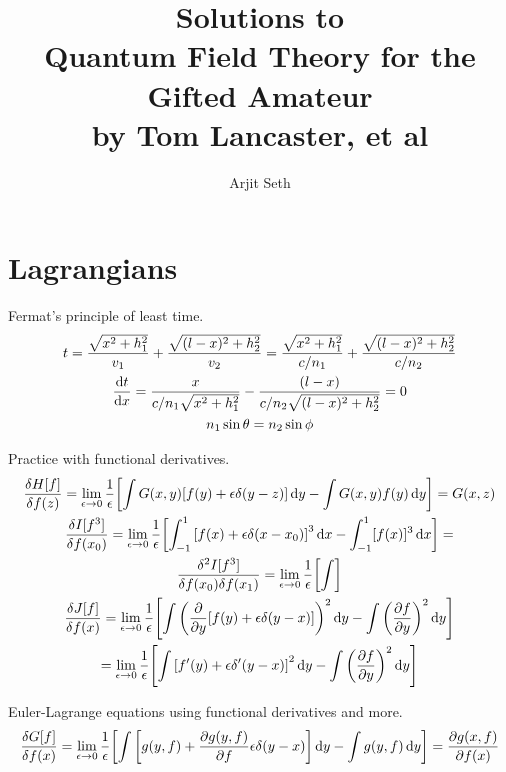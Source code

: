 \documentclass{report}
\begin{document}
\title{Solutions to \\ Quantum Field Theory for the Gifted Amateur \\ by Tom Lancaster, et al}

\author{Arjit Seth}

\maketitle


\chapter{Lagrangians}

\begin{subquests}
	\item Fermat's principle of least time.
	\begin{gather*}
		t = \frac{\sqrt{x^2 + h_1^2}}{v_1} + \frac{\sqrt{(l-x)^2+h_2^2}}{v_2} = \frac{\sqrt{x^2 + h_1^2}}{c/n_1} + \frac{\sqrt{(l-x)^2+h_2^2}}{c/n_2} \\
		\dv{t}{x} = \frac{x}{c/n_1\sqrt{x^2 + h_1^2}} - \frac{(l-x)}{c/n_2\sqrt{(l-x)^2 + h_2^2}} = 0 \\
		n_1\sin\theta = n_2\sin\phi
	\end{gather*}
	
	\item Practice with functional derivatives.
	\begin{gather*}
		\fdv{H[f]}{f(z)} = \lim_{\epsilon \to 0} \frac{1}{\epsilon}\bqty{\int G(x,y)[f(y) + \epsilon\delta(y-z)]\dd{y} - \int G(x,y)f(y)\dd{y}} = G(x,z) \\
		\fdv{I[f^3]}{f(x_0)} =  \lim_{\epsilon \to 0} \frac{1}{\epsilon}\bqty{\int_{-1}^1 \bqty{f(x) + \epsilon\delta(x-x_0)}^3\dd{x} -\int_{-1}^1 [f(x)]^3 \dd{x}} =  \\
		\frac{\delta^2 I[f^3]}{\delta f(x_0)\delta f(x_1)} = \lim_{\epsilon \to 0} \frac{1}{\epsilon}\bqty{\int} \\
		\fdv{J[f]}{f(x)} = \lim_{\epsilon \to 0} \frac{1}{\epsilon}\bqty{\int \pqty{\pdv{y}[f(y) + \epsilon\delta(y-x)]}^2 \dd{y} - \int \pqty{\pdv{f}{y}}^2 \dd{y}} \\
		= \lim_{\epsilon \to 0} \frac{1}{\epsilon}\bqty{\int \bqty{f'(y) + \epsilon\delta'(y-x)}^2 \dd{y} - \int \pqty{\pdv{f}{y}}^2 \dd{y}}
	 \end{gather*}

	\item Euler-Lagrange equations using functional derivatives and more.
	\begin{gather*}
		\fdv{G[f]}{f(x)} = \lim_{\epsilon \to 0} \frac{1}{\epsilon}\bqty{\int \bqty{g(y,f) + \pdv{g(y,f)}{f}\epsilon\delta(y-x)}\dd{y} - \int g(y,f)\dd{y}} = \pdv{g(x,f)}{f(x)}
 	\end{gather*}


\end{subquests}
\end{document}

